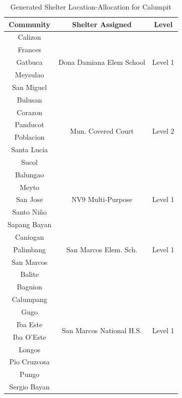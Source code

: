 	\begin{table}[h]
		\centering
		\caption{Generated Shelter Location-Allocation for Calumpit}
		\label{calReport}
		\begin{tabular}{|c|c|c|}
			\hline
			\textbf{Community} & \textbf{Shelter Assigned} & \textbf{Level} \\ \hline
			Calizon & \multirow{5}{*}{Dona Damiana Elem School} & \multirow{5}{*}{Level 1} \\ \cline {1-1} 
			Frances & & \\ \cline {1-1} 
			Gatbuca & & \\ \cline {1-1} 
			Meysulao & & \\ \cline {1-1} 
			San Miguel  & & \\ \hline
			
			Bulusan & \multirow{6}{*}{Mun. Covered Court} & \multirow{6}{*}{Level 2} \\ \cline {1-1} 
			Corazon & & \\ \cline {1-1} 
			Panducot & & \\ \cline {1-1} 
			Poblacion & & \\ \cline {1-1} 
			Santa Lucia & & \\ \cline {1-1} 
			Sucol & & \\ \hline
			
			Balungao & \multirow{5}{*}{NV9 Multi-Purpose} & \multirow{5}{*}{Level 1} \\ \cline {1-1} 
			Meyto & & \\ \cline {1-1} 
			San Jose & & \\ \cline {1-1} 
			Santo Niño & & \\ \cline {1-1} 
			Sapang Bayan & & \\ \hline
			
			Caniogan & \multirow{3}{*}{San Marcos Elem. Sch.} & \multirow{3}{*}{Level 1} \\ \cline {1-1} 
			Palimbang & & \\ \cline {1-1} 
			San Marcos & & \\ \hline
			
			Balite & \multirow{10}{*}{San Marcos National H.S.} & \multirow{10}{*}{Level 1} \\ \cline {1-1} 
			Baguion & & \\ \cline {1-1} 
			Calumpang & & \\ \cline {1-1} 
			Gugo & & \\ \cline {1-1} 
			Iba Este & & \\ \cline {1-1} 
			Iba O'Este & & \\ \cline {1-1} 
			Longos & & \\ \cline {1-1} 
			Pio Cruzcosa & & \\ \cline {1-1} 
			Pungo & & \\ \cline {1-1} 
			Sergio Bayan & & \\ \hline
		\end{tabular}
		
	\end{table}
	
